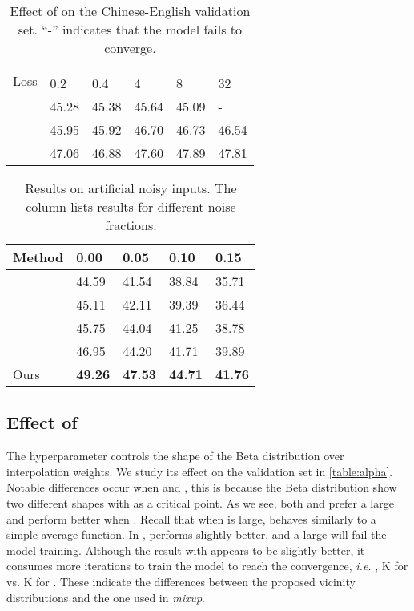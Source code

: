 \documentclass[11pt,a4paper]{article}
\newcommand{\ie}{\emph{i.e. }} \newcommand{\Ie}{\emph{I.e}}
\newcommand{\mixup}{\textit{mixup}\xspace}
\begin{document}
\begin{table}[!t]
\centering
\setlength\tabcolsep{3.9pt}
\begin{tabular}{l|l|l|l|l|l}
\hline
\multirow{2}{*}{Loss} &\multicolumn{5}{c}{} \\
\cline{2-6}
&0.2 &0.4 &4 &8 & 32 \\

\hline \hline
 &45.28 &45.38 &45.64 &45.09 & -\\
{} &45.95 &45.92 &46.70 &46.73 &46.54\\
{\!\tiny \!} &47.06 &46.88  &47.60  &47.89 &47.81 \\
\hline
\end{tabular}
\caption{Effect of  on the Chinese-English validation set. ``-'' indicates that the model fails to converge.}
\label{table:alpha} 
\end{table}

\begin{table}[!t]
\centering
\setlength\tabcolsep{4.5pt}
\begin{tabular}{l|l|l|l|l}
\hline
Method &0.00 &0.05 &0.10 &0.15 \\
\hline \hline
\citeauthor{Vaswani:17} &44.59 &41.54 &38.84 &35.71\\
\citeauthor{Miyato:17} &45.11 &42.11 &39.39 &36.44\\
\citeauthor{Sano:19} &45.75 &44.04 &41.25 &38.78\\
\citeauthor{Cheng:19} &46.95 &44.20 &41.71 &39.89\\
\hline
Ours &\textbf{49.26} &\textbf{47.53} &\textbf{44.71} &\textbf{41.76}\\
\hline
\end{tabular}
\caption{Results on artificial noisy inputs. The column lists results for different noise fractions.}
\label{table:robust}
\end{table}

\subsection{Effect of }
The hyperparameter  controls the shape of the Beta distribution over interpolation weights. 
We study its effect on the validation set in \autoref{table:alpha}.
Notable differences occur when  and , this is because the Beta distribution show two different shapes with  as a critical point. 
As we see, both  and  prefer a large  and perform better when . Recall that when  is large,  behaves similarly to a simple average function. 
In ,  performs slightly better, and a large  will fail the model training. Although the result with  appears to be slightly better, it consumes more iterations to train the model to reach the convergence, \ie, K for  vs. K for . These indicate the differences between the proposed vicinity distributions and the one used in \mixup. 
\end{document}
